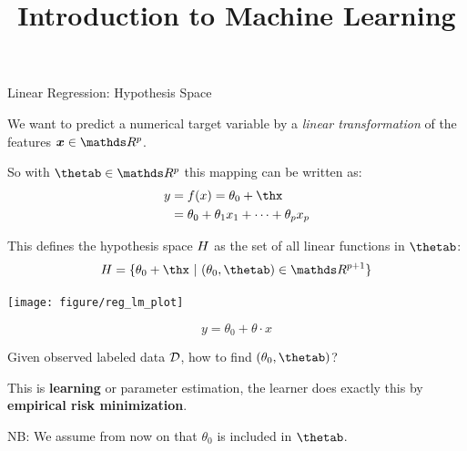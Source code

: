 \documentclass[11pt,compress,t,notes=noshow, xcolor=table]{beamer}
\title{Introduction to Machine Learning}
\institute{\href{https://compstat-lmu.github.io/lecture_i2ml/}{compstat-lmu.github.io/lecture\_i2ml}}
\date{}
\newenvironment{knitrout}{}{} %
\begin{document}


















\begin{vbframe}{Linear Regression: Hypothesis Space}
\lz

We want to predict a numerical target variable by a \emph{linear transformation} of the features $\xv \in \R^p$.

\lz

So with $\thetab \in \R^p$ this mapping can be written as:
\begin{align*}
y &= \fx = \theta_0 + \thx \\
  &= \theta_0 + \theta_1 x_1 + \dots + \theta_p x_p
\end{align*}

\lz

This defines the hypothesis space $H$ as the set of all linear functions in $\thetab$:
\[
\Hspace = \{ \theta_0 + \thx\ |\ (\theta_0, \thetab) \in \R^{p+1} \}
\]

\framebreak

\begin{knitrout}\scriptsize
{}\color{fgcolor}

{\centering \texttt{[image: figure/reg\_lm\_plot]} 

}



\end{knitrout}

\[
y = \theta_0 + \theta \cdot x
\]

\framebreak

\lz

Given observed labeled data $\mathcal{D}$, how to find $(\theta_0, \thetab)$?\\

\lz

This is \textbf{learning} or parameter estimation, the learner does exactly this by \textbf{empirical risk minimization}.

\lz
\lz

NB: We assume from now on that $\theta_0$ is included in $\thetab$.

\end{vbframe}
\end{document}
